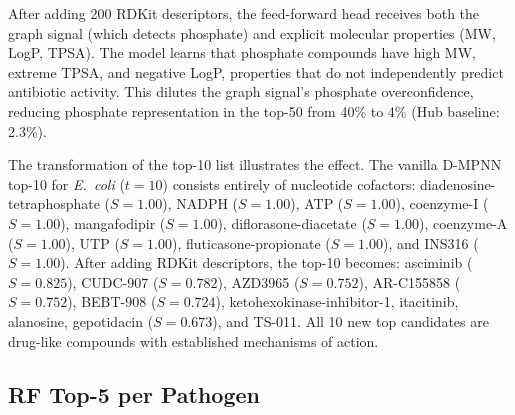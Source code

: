 \documentclass{article}
\begin{document}
After adding 200 RDKit descriptors, the feed-forward head receives both the graph signal (which detects phosphate) and explicit molecular properties (MW, LogP, TPSA).
The model learns that phosphate compounds have high MW, extreme TPSA, and negative LogP, properties that do not independently predict antibiotic activity.
This dilutes the graph signal's phosphate overconfidence, reducing phosphate representation in the top-50 from 40\% to 4\% (Hub baseline: 2.3\%).

The transformation of the top-10 list illustrates the effect. The vanilla D-MPNN top-10 for \textit{E.~coli} ($t{=}10$) consists entirely of nucleotide cofactors: diadenosine-tetraphosphate ($S = 1.00$), NADPH ($S = 1.00$), ATP ($S = 1.00$), coenzyme-I ($S = 1.00$), mangafodipir ($S = 1.00$), diflorasone-diacetate ($S = 1.00$), coenzyme-A ($S = 1.00$), UTP ($S = 1.00$), fluticasone-propionate ($S = 1.00$), and INS316 ($S = 1.00$).
After adding RDKit descriptors, the top-10 becomes: asciminib ($S = 0.825$), CUDC-907 ($S = 0.782$), AZD3965 ($S = 0.752$), AR-C155858 ($S = 0.752$), BEBT-908 ($S = 0.724$), ketohexokinase-inhibitor-1, itacitinib, alanosine, gepotidacin ($S = 0.673$), and TS-011.
All 10 new top candidates are drug-like compounds with established mechanisms of action.

\subsection{RF Top-5 per Pathogen}
\end{document}
